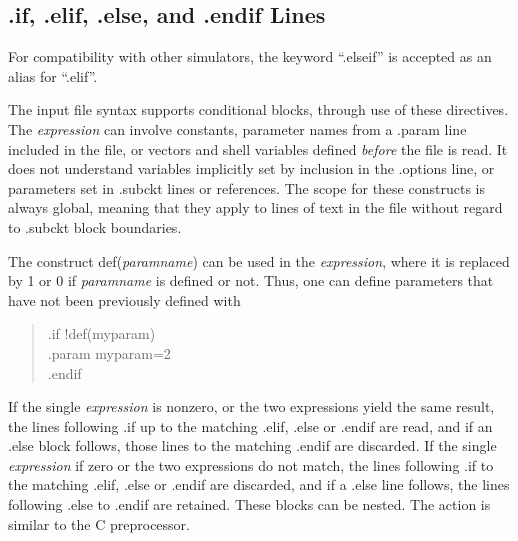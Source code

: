 \subsection{{\vt .if}, {\vt .elif}, {\vt .else}, and {\vt .endif} Lines}

For compatibility with other simulators, the keyword ``{\vt .elseif}''
is accepted as an alias for ``{\vt .elif}''.

The {\WRspice} input file syntax supports conditional blocks, through
use of these directives.  The {\it expression} can involve constants,
parameter names from a {\vt .param} line included in the file, or
vectors and shell variables defined {\it before} the file is read.  It
does not understand variables implicitly set by inclusion in the {\vt
.options} line, or parameters set in {\vt .subckt} lines or
references.  The scope for these constructs is always global, meaning
that they apply to lines of text in the file without regard to {\vt
.subckt} block boundaries.

The construct {\vt def}({\it paramname\/}) can be used in the {\it
expression\/}, where it is replaced by 1 or 0 if {\it paramname} is
defined or not.  Thus, one can define parameters that have not been
previously defined with
\begin{quote}\vt
.if !def(myparam)\\ 
.param myparam=2\\
.endif
\end{quote}

If the single {\it expression} is nonzero, or the two expressions
yield the same result, the lines following {\vt .if} up to the
matching {\vt .elif}, {\vt .else} or {\vt .endif} are read, and if an
{\vt .else} block follows, those lines to the matching {\vt .endif}
are discarded.  If the single {\it expression} if zero or the two
expressions do not match, the lines following {\vt .if} to the
matching {\vt .elif}, {\vt .else} or {\vt .endif} are discarded, and
if a {\vt .else} line follows, the lines following {\vt .else} to {\vt
.endif} are retained.  These blocks can be nested.  The action is
similar to the C preprocessor.

